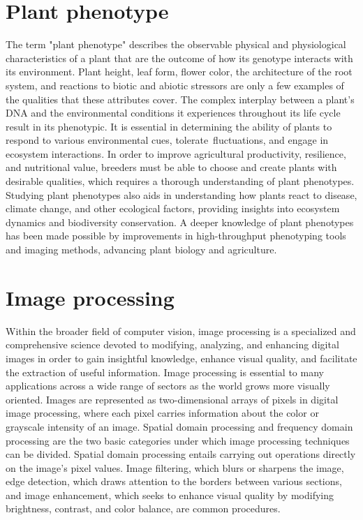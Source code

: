 \documentclass[a4paper,11pt]{report}%
\renewcommand{\\}{\vspace*{0.5\baselineskip} \newline}
\begin{document}
\section{Plant phenotype}
The term "plant phenotype" describes the observable physical and physiological characteristics of a plant that are the outcome of how its genotype interacts with its environment. Plant height, leaf form, flower color, the architecture of the root system, and reactions to biotic and abiotic stressors are only a few examples of the qualities that these attributes cover. The complex interplay between a plant's DNA and the environmental conditions it experiences throughout its life cycle result in its phenotypic.
It is essential in determining the ability of plants to respond to various environmental cues, tolerate fluctuations, and engage in ecosystem interactions. In order to improve agricultural productivity, resilience, and nutritional value, breeders must be able to choose and create plants with desirable qualities, which requires a thorough understanding of plant phenotypes. Studying plant phenotypes also aids in understanding how plants react to disease, climate change, and other ecological factors, providing insights into ecosystem dynamics and biodiversity conservation. A deeper knowledge of plant phenotypes has been made possible by improvements in high-throughput phenotyping tools and imaging methods, advancing plant biology and agriculture.


\section{Image processing}
Within the broader field of computer vision, image processing is a specialized and comprehensive science devoted to modifying, analyzing, and enhancing digital images in order to gain insightful knowledge, enhance visual quality, and facilitate the extraction of useful information. Image processing is essential to many applications across a wide range of sectors as the world grows more visually oriented.
Images are represented as two-dimensional arrays of pixels in digital image processing, where each pixel carries information about the color or grayscale intensity of an image. Spatial domain processing and frequency domain processing are the two basic categories under which image processing techniques can be divided. Spatial domain processing entails carrying out operations directly on the image's pixel values. Image filtering, which blurs or sharpens the image, edge detection, which draws attention to the borders between various sections, and image enhancement, which seeks to enhance visual quality by modifying brightness, contrast, and color balance, are common procedures.
\end{document}
